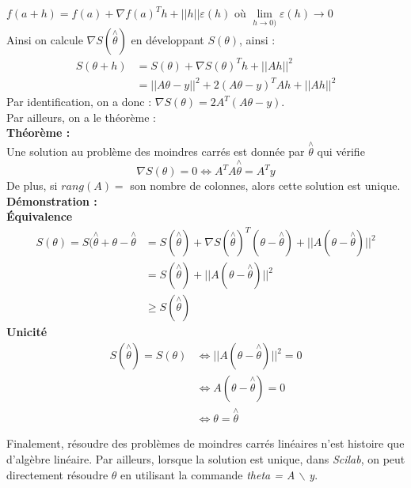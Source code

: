 \documentclass[a4paper,10pt]{report}
\begin{document}
$f(a+h)=f(a)+\nabla f(a)^Th + ||h||\varepsilon(h)$ où $\lim \limits_{h\rightarrow 0)} \varepsilon(h) \rightarrow 0$\\
Ainsi on calcule $\nabla S(\overset{\wedge}{\theta})$ en développant $S(\theta)$, ainsi :
\begin{align*}
S(\theta+h) & = S(\theta) + \nabla S(\theta)^Th + ||Ah||^2 \\
			& = ||A\theta -y||^2 + 2(A\theta-y)^TAh + ||Ah||^2
\end{align*}
Par identification, on a donc : $\nabla S(\theta)=2A^T(A\theta -y)$.\\
Par ailleurs, on a le théorème :\\
\textbf{Théorème :}\\
Une solution au problème des moindres carrés est donnée par $\overset{\wedge}{\theta}$ qui vérifie
\begin{equation}
\nabla S(\theta)=0 \Leftrightarrow A^TA\overset{\wedge}{\theta}=A^Ty
\end{equation}
De plus, si $rang(A)=$ son nombre de colonnes, alors cette solution est unique. \\

\textbf{Démonstration :}\\
\indent \textbf{Équivalence}\\
\indent \begin{align*}
		S(\theta)=S(\overset{\wedge}{\theta}+\theta -\overset{\wedge}{\theta} & = S(\overset{\wedge}{\theta}) + \nabla S(\overset{\wedge}{\theta})^T(\theta - \overset{\wedge}{\theta}) + ||A(\theta - \overset{\wedge}{\theta})||^2 \\
		& = S(\overset{\wedge}{\theta}) + ||A(\theta - \overset{\wedge}{\theta})||^2 \\
		& \geq S(\overset{\wedge}{\theta})
\end{align*}
\indent \textbf{Unicité}\\
\indent \begin{align*}
S(\overset{\wedge}{\theta})=S(\theta) & \Longleftrightarrow ||A(\theta - \overset{\wedge}{\theta})||^2 = 0 \\
& \Longleftrightarrow A(\theta - \overset{\wedge}{\theta})=0 \\
& \Longleftrightarrow \theta = \overset{\wedge}{\theta}
\end{align*}

Finalement, résoudre des problèmes de moindres carrés linéaires n'est histoire que d'algèbre linéaire. Par ailleurs, lorsque la solution est unique, dans \textit{Scilab}, on peut directement résoudre $\theta$ en utilisant la commande \textit{theta = A $\backslash$ y}.
\end{document}
